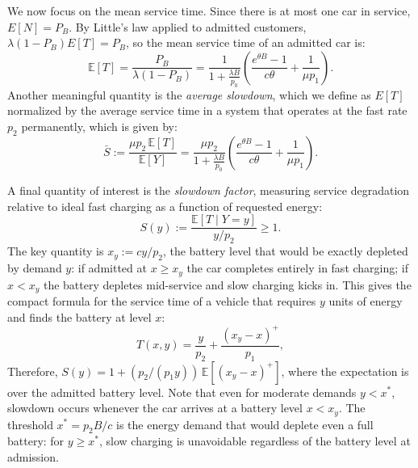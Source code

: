 \documentclass{sig-alternate-per-modified}
\renewcommand{\geq}{\geqslant}
\begin{document}
We now focus on the mean service time. Since there is at most one car in service, $E[N] = P_B$. By Little's law applied to admitted customers, $\lambda(1-P_B)E[T] = P_B$, so the mean service time of an admitted car is:
\begin{equation}
  \mathbb{E}[T] = \frac{P_B}{\lambda(1-P_B)}
  = \frac{1}{1 + \frac{\lambda B}{p_0}}\left(\frac{e^{\theta B}-1}{c\theta} + \frac{1}{\mu p_1}\right).
  \label{eq:ET}
\end{equation}
Another meaningful quantity is the \emph{average slowdown}, which we define as $E[T]$ normalized by the average service time in a system that operates at the fast rate $p_2$ permanently, which is given by:
\begin{equation}\label{eq:avg_slowdown}
  \bar{S} := \frac{\mu p_2\, \mathbb{E}[T]}{\mathbb{E}[Y]} = \frac{\mu p_2}{1 + \frac{\lambda B}{p_0}}\left(\frac{e^{\theta B}-1}{c\theta} + \frac{1}{\mu p_1}\right).
\end{equation}

A final quantity of interest is the \emph{slowdown factor}, measuring service
degradation relative to ideal fast charging as a function of requested energy:
\begin{equation}\label{eq:slowdown}
  S(y) := \frac{\mathbb{E}[T \mid Y=y]}{y/p_2} \geq 1.
\end{equation}
The key quantity is $x_y := cy/p_2$, the battery level that would be exactly depleted
by demand $y$: if admitted at $x \geq x_y$ the car completes entirely in fast
charging; if $x < x_y$ the battery depletes mid-service and slow charging kicks in.
This gives the compact formula for the service time of a vehicle that requires $y$ units of energy and finds the battery at level $x$:
\begin{equation}
  T(x,y) = \frac{y}{p_2} + \frac{(x_y - x)^+}{p_1},
  \label{eq:Txy}
\end{equation}
Therefore, $S(y) = 1 + (p_2/(p_1 y))\,\mathbb{E}[(x_y - x)^+]$, where the expectation
is over the admitted battery level. Note that even for moderate demands $y < x^*$,
slowdown occurs whenever the car arrives at a battery level $x < x_y$. The threshold $x^* = p_2 B/c$
is the energy demand that would deplete even a full battery: for $y \geq x^*$,
slow charging is unavoidable regardless of the battery level at admission.
\end{document}
